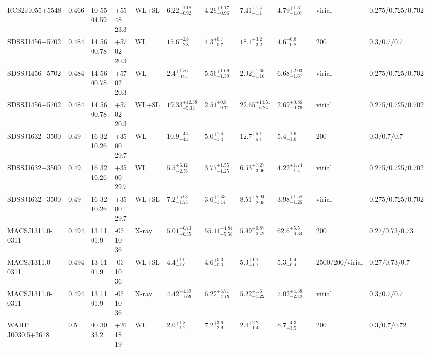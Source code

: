 \begin{landscape}
\begin{center}
{\begin{longtable}{llllllllllll}
RCS2J1055+5548 & 0.466 & 10 55 04.59 & +55 48 23.3 & WL+SL & ${6.22}^{+1.18}_{-0.92}$ & ${4.29}^{+1.17}_{-0.96}$ & ${7.41}^{+1.4}_{-1.1}$ & ${4.79}^{+1.31}_{-1.07}$ & \citet{OG12.1} & virial & 0.275/0.725/0.702 \\
SDSSJ1456+5702 & 0.484 & 14 56 00.78 & +57 02 20.3 & WL & ${15.6}^{+2.8}_{-2.8}$ & ${4.3}^{+0.7}_{-0.7}$ & ${18.1}^{+3.2}_{-3.2}$ & ${4.6}^{+0.8}_{-0.8}$ & \citet{SE14.1} & 200 & 0.3/0.7/0.7 \\
SDSSJ1456+5702 & 0.484 & 14 56 00.78 & +57 02 20.3 & WL & ${2.4}^{+1.36}_{-0.95}$ & ${5.56}^{+1.69}_{-1.39}$ & ${2.92}^{+1.65}_{-1.16}$ & ${6.68}^{+2.03}_{-1.67}$ & \citet{OG12.1} & virial & 0.275/0.725/0.702 \\
SDSSJ1456+5702 & 0.484 & 14 56 00.78 & +57 02 20.3 & WL+SL & ${19.33}^{+12.38}_{-5.33}$ & ${2.51}^{+0.8}_{-0.71}$ & ${22.65}^{+14.51}_{-6.24}$ & ${2.69}^{+0.86}_{-0.76}$ & \citet{OG12.1} & virial & 0.275/0.725/0.702 \\
SDSSJ1632+3500 & 0.49 & 16 32 10.26 & +35 00 29.7 & WL & ${10.9}^{+4.4}_{-4.4}$ & ${5.0}^{+1.4}_{-1.4}$ & ${12.7}^{+5.1}_{-5.1}$ & ${5.4}^{+1.6}_{-1.6}$ & \citet{SE14.1} & 200 & 0.3/0.7/0.7 \\
SDSSJ1632+3500 & 0.49 & 16 32 10.26 & +35 00 29.7 & WL & ${5.5}^{+6.12}_{-2.58}$ & ${3.77}^{+1.55}_{-1.25}$ & ${6.53}^{+7.27}_{-3.06}$ & ${4.22}^{+1.74}_{-1.4}$ & \citet{OG12.1} & virial & 0.275/0.725/0.702 \\
SDSSJ1632+3500 & 0.49 & 16 32 10.26 & +35 00 29.7 & WL+SL & ${7.2}^{+5.03}_{-1.73}$ & ${3.6}^{+1.43}_{-1.14}$ & ${8.51}^{+5.94}_{-2.05}$ & ${3.98}^{+1.58}_{-1.26}$ & \citet{OG12.1} & virial & 0.275/0.725/0.702 \\
MACSJ1311.0-0311 & 0.494 & 13 11 01.9 & -03 10 36 & X-ray & ${5.01}^{+0.73}_{-0.35}$ & ${55.11}^{+4.84}_{-5.58}$ & ${5.99}^{+0.87}_{-0.42}$ & ${62.6}^{+5.5}_{-6.34}$ & \citet{BA14.1} & 200 & 0.27/0.73/0.73 \\
MACSJ1311.0-0311 & 0.494 & 13 11 01.9 & -03 10 36 & WL+SL & ${4.4}^{+1.0}_{-1.0}$ & ${4.6}^{+0.3}_{-0.3}$ & ${5.3}^{+1.1}_{-1.1}$ & ${5.3}^{+0.4}_{-0.4}$ & \citet{ME14.1} & 2500/200/virial & 0.27/0.73/0.7 \\
MACSJ1311.0-0311 & 0.494 & 13 11 01.9 & -03 10 36 & X-ray & ${4.42}^{+1.39}_{-1.05}$ & ${6.22}^{+3.71}_{-2.15}$ & ${5.22}^{+1.6}_{-1.22}$ & ${7.02}^{+4.38}_{-2.49}$ & \citet{SC07.1} & virial & 0.3/0.7/0.7 \\
WARP J0030.5+2618 & 0.5 & 00 30 33.2 & +26 18 19 & WL & ${2.0}^{+1.8}_{-1.2}$ & ${7.2}^{+3.6}_{-2.9}$ & ${2.4}^{+2.2}_{-1.4}$ & ${8.7}^{+4.3}_{-3.5}$ & \citet{IS10.1} & 200 & 0.3/0.7/0.72 \\

\end{longtable}}
\end{center}
\end{landscape}
